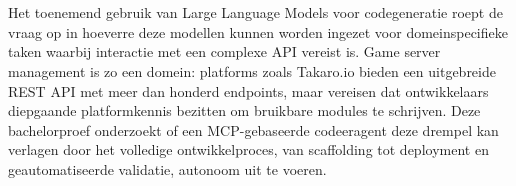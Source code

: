 
%
%
%
%
%

%



\chapter*{}

Het toenemend gebruik van Large Language Models voor codegeneratie roept de vraag op in hoeverre deze modellen kunnen worden ingezet voor domeinspecifieke taken waarbij interactie met een complexe API vereist is. Game server management is zo een domein: platforms zoals Takaro.io bieden een uitgebreide REST API met meer dan honderd endpoints, maar vereisen dat ontwikkelaars diepgaande platformkennis bezitten om bruikbare modules te schrijven. Deze bachelorproef onderzoekt of een MCP-gebaseerde codeeragent deze drempel kan verlagen door het volledige ontwikkelproces, van scaffolding tot deployment en geautomatiseerde validatie, autonoom uit te voeren.

